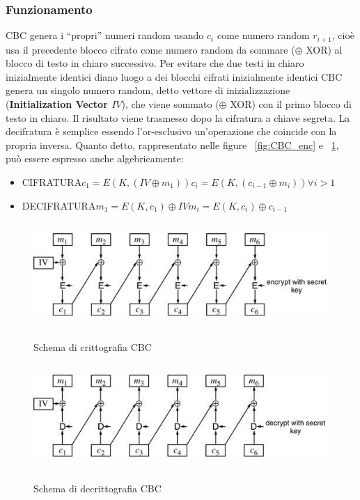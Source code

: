 \subsubsection{Funzionamento}
CBC genera i “propri” numeri random usando $c_{i}$ come numero random $r_{i+1}$, cioè usa il precedente blocco cifrato come numero random da sommare ($\oplus$ XOR) al blocco di testo in chiaro successivo.\newline
Per evitare che due testi in chiaro inizialmente identici diano luogo a dei blocchi cifrati inizialmente identici CBC genera un singolo numero random, detto vettore di inizializzazione (\textbf{Initialization Vector $IV$}), che viene sommato ($\oplus$ XOR) con il primo blocco di testo in chiaro. \newline
Il risultato viene trasmesso dopo la cifratura a chiave segreta. \newline
La decifratura è semplice essendo l'or-esclusivo un'operazione che coincide con la propria inversa.\newline
Quanto detto, rappresentato nelle figure \figurename ~\ref{fig:CBC_enc} e \figurename ~\ref{fig:CBC_dec}, può essere espresso anche algebricamente:
\begin{itemize}
\item CIFRATURA\newline $c_{1} = E(K, (IV \oplus m_{1}))$\newline $c_{i} = E(K, (c_{i-1} \oplus m_{i})) \forall i > 1$
\item DECIFRATURA\newline $m_{1} = E(K,c_{1})\oplus IV$\newline $m_{i} = E(K,c_{i})\oplus c_{i-1}$
\end{itemize}
\begin{figure}[htbp]
	\centering%
	\subfigure%
	{\includegraphics[height=4cm, width=12cm, keepaspectratio]{Immagini/Capitolo3/CBC_enc.png}}
	\caption{Schema di crittografia CBC \label{fig:CBC_enc}} 	
	\subfigure%
	{\includegraphics[height=4cm, width=12cm, keepaspectratio]{Immagini/Capitolo3/CBC_dec.png}}
	\caption{Schema di decrittografia CBC \label{fig:CBC_dec}} 
\end{figure}
